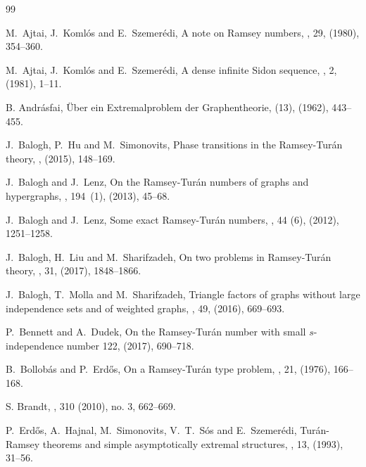 \begin{thebibliography}{99}
	\setlength{\parskip}{0pt}
	\setlength{\itemsep}{0pt plus 0.3ex}
	\small

M.~Ajtai, J.~Koml\'os and E.~Szemer\'edi,
\newblock A note on Ramsey numbers,
, 29, (1980), 354--360.

M.~Ajtai, J.~Koml\'os and E.~Szemer\'edi,
\newblock A dense infinite Sidon sequence,
, 2, (1981), 1--11.

B. Andr\'asfai,
\newblock \"Uber ein Extremalproblem der Graphentheorie,
 (13), (1962), 443--455.

J.~Balogh, P.~Hu and M.~Simonovits,
\newblock Phase transitions in the Ramsey-Tur\'an theory,
, (2015), 148--169. 

J.~Balogh and J.~Lenz,
\newblock On the {R}amsey-{T}ur\'an numbers of graphs and hypergraphs,
, 194~(1), (2013), 45--68.

J.~Balogh and J.~Lenz,
\newblock Some exact {R}amsey-{T}ur\'an numbers,
, 44 (6), (2012), 1251--1258.

J.~Balogh, H.~Liu and M.~Sharifzadeh,
\newblock On two problems in Ramsey-Tur\'an theory,
, 31, (2017), 1848--1866.

J.~Balogh, T.~Molla and M.~Sharifzadeh,
\newblock Triangle factors of graphs without large independence sets and of weighted graphs,
, 49, (2016), 669--693.

P.~Bennett and A.~Dudek,
\newblock On the Ramsey-Tur\'an number with small $s$-independence number
 122, (2017), 690--718.

B.~Bollob\'as and P.~Erd\H os,
\newblock On a Ramsey-Tur\'an type problem,
, 21, (1976), 166--168.

S. Brandt,
, 
 310 (2010), no. 3, 662--669.

P.~Erd\H os, A.~Hajnal, M.~Simonovits, V.~T.~S\'os and E.~Szemer\'edi,
\newblock Tur\'an-Ramsey theorems and simple asymptotically extremal structures,
, 13, (1993), 31--56.


\end{thebibliography}
